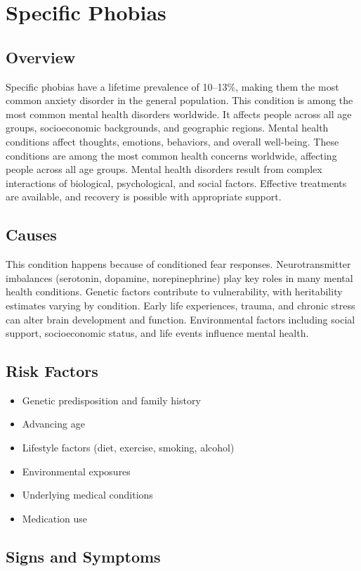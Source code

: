 \chapter{Specific Phobias}
\label{sec:Specific Phobias}

\section{Overview}
Specific phobias have a lifetime prevalence of 10--13\%, making them the most common anxiety disorder in the general population. This condition is among the most common mental health disorders worldwide. It affects people across all age groups, socioeconomic backgrounds, and geographic regions. Mental health conditions affect thoughts, emotions, behaviors, and overall well-being. These conditions are among the most common health concerns worldwide, affecting people across all age groups. Mental health disorders result from complex interactions of biological, psychological, and social factors. Effective treatments are available, and recovery is possible with appropriate support.
\section{Causes}
This condition happens because of conditioned fear responses.  Neurotransmitter imbalances (serotonin, dopamine, norepinephrine) play key roles in many mental health conditions. Genetic factors contribute to vulnerability, with heritability estimates varying by condition. Early life experiences, trauma, and chronic stress can alter brain development and function. Environmental factors including social support, socioeconomic status, and life events influence mental health.   
\section{Risk Factors}
\begin{itemize}[noitemsep]
  \item Genetic predisposition and family history
  \item Advancing age
  \item Lifestyle factors (diet, exercise, smoking, alcohol)
  \item Environmental exposures
  \item Underlying medical conditions
  \item Medication use
\end{itemize}
\section{Signs and Symptoms}
